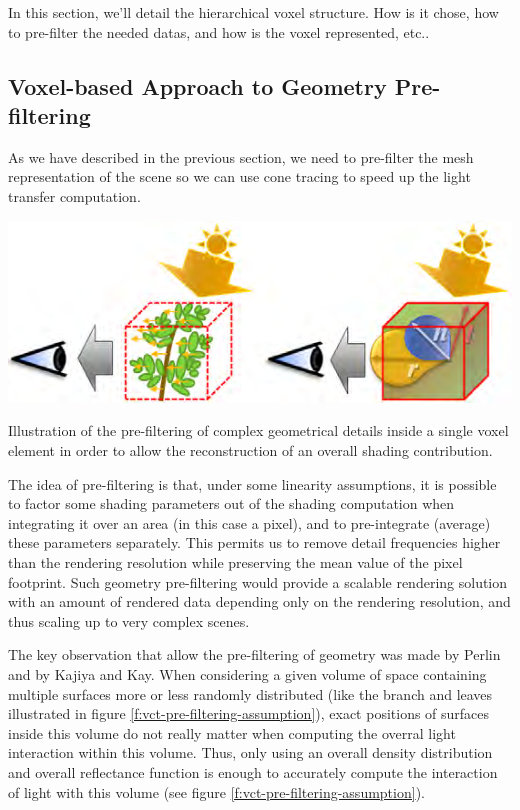 In this section, we'll detail the hierarchical voxel structure. How is it chose, how to pre-filter the needed datas, and how is the voxel represented, etc..




\subsection{Voxel-based Approach to Geometry Pre-filtering}
As we have described in the previous section, we need to pre-filter the mesh representation of the scene so we can use cone tracing to speed up the light transfer computation. 

\begin{marginfigure}
	\includegraphics{graphics/vct/vct-4-1}
	\caption{Illustration of the pre-filtering of complex geometrical details inside a single voxel element in order to allow the reconstruction of an overall shading contribution.}
	\label{f:vct-pre-filtering-assumption}
\end{marginfigure}

The idea of pre-filtering is that, under some linearity assumptions, it is possible to factor some shading parameters out of the shading computation when integrating it over an area (in this case a pixel), and to pre-integrate (average) these parameters separately. This permits us to remove detail frequencies higher than the rendering resolution while preserving the mean value of the pixel footprint. Such geometry pre-filtering would provide a scalable rendering solution with an amount of rendered data depending only on the rendering resolution, and thus scaling up to very complex scenes.

The key observation that allow the pre-filtering of geometry was made by Perlin\cite{a:hypetrtexture} and by Kajiya and Kay\cite[5mm]{a:Renderingfurwiththreedimensionaltextures}. When considering a given volume of space containing multiple surfaces more or less randomly distributed (like the branch and leaves illustrated in figure \ref{f:vct-pre-filtering-assumption}), exact positions of surfaces inside this volume do not really matter when computing the overral light interaction within this volume. Thus, only using an overall density distribution and overall reflectance function is enough to accurately compute the interaction of light with this volume (see figure \ref{f:vct-pre-filtering-assumption}).

